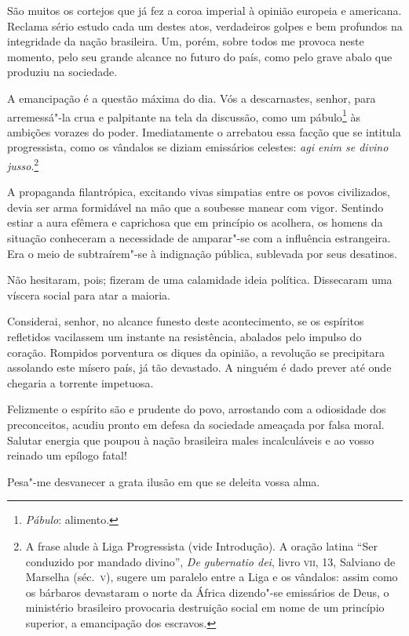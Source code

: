 \begin{linenumbers}
São muitos os cortejos que já fez a coroa imperial à opinião europeia e
americana. Reclama sério estudo cada um destes atos, verdadeiros golpes
e bem profundos na integridade da nação brasileira. Um, porém, sobre
todos me provoca neste momento, pelo seu grande alcance no futuro do
país, como pelo grave abalo que produziu na sociedade.

A emancipação é a questão máxima do dia. Vós a descarnastes, senhor,
para arremessá"-la crua e palpitante na tela da discussão, como um
pábulo\footnote{ \textit{Pábulo}: alimento.} às ambições vorazes do poder. Imediatamente o arrebatou essa facção que
se intitula progressista, como os vândalos se diziam emissários celestes: \textit{agi enim se
divino jusso}.\footnote{ A frase alude à Liga Progressista (vide Introdução). 
A oração latina ``Ser conduzido por mandado divino'', \textit{De gubernatio dei}, livro \textsc{vii}, 13, Salviano 
de Marselha (séc.~\textsc{v}), sugere um paralelo entre a Liga e os vândalos: assim como os bárbaros devastaram 
o norte da África dizendo"-se emissários de Deus, o ministério brasileiro provocaria destruição social 
em nome de um princípio superior, a emancipação dos escravos.} 

A propaganda filantrópica, excitando vivas simpatias entre os povos
civilizados, devia ser arma formidável na mão que a soubesse manear com
vigor. Sentindo estiar a aura efêmera e caprichosa que em princípio os
acolhera, os homens da situação conheceram a necessidade de
amparar"-se com a influência estrangeira. Era o meio de
subtraírem"-se à indignação pública, sublevada por seus desatinos.

Não hesitaram, pois; fizeram de uma calamidade ideia política.
Dissecaram uma víscera social para atar a maioria. 

Considerai, senhor, no alcance funesto deste acontecimento, se os
espíritos refletidos vacilassem um instante na resistência, abalados
pelo impulso do coração. Rompidos porventura os diques da opinião, a
revolução se precipitara assolando este mísero país, já tão devastado.
A ninguém é dado prever até onde chegaria a torrente impetuosa. 

Felizmente o espírito são e prudente do povo, arrostando com a
odiosidade dos preconceitos, acudiu pronto em defesa da sociedade
ameaçada por falsa moral. Salutar energia que poupou à nação brasileira
males incalculáveis e ao vosso reinado um epílogo fatal! 

Pesa"-me desvanecer a grata ilusão em que se deleita vossa alma. 


\end{linenumbers}
